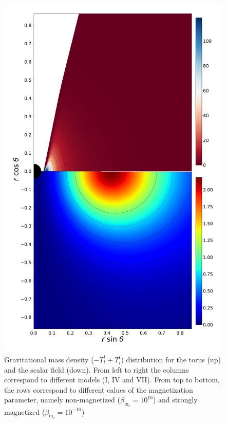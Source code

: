 \documentclass[twocolumn,aps,showpacs,showkeys,prd,superscriptaddress,byrevtex, amsmath]{revtex4-1}
\begin{document}
\begin{figure}
\includegraphics[scale=0.12]{figures/fig5_VII__10.pdf}
\hspace{-0.2cm}
\caption{Gravitational mass density ($-T^t_t+T^i_i$) distribution for the torus (up) and the scalar field (down). From left to right the columns correspond to different models (I, IV and VII). From top to bottom, the rows correspond to different calues of the magnetization parameter, namely non-magnetized ($\beta_{\mathrm{m}_{\mathrm{c}}} = 10^{10}$) and strongly magnetized ($\beta_{\mathrm{m}_{\mathrm{c}}} = 10^{-10}$)}
\label{comparison_mass_density}
\end{figure}
\end{document}
